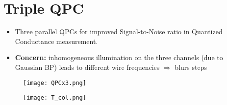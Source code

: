\documentclass[11pt]{article}
\begin{document}
\section{Triple QPC}
\begin{itemize}
	\item Three parallel QPCs for improved Signal-to-Noise ratio in Quantized Conductance measurement.
	\item \textbf{Concern:} inhomogeneous illumination on the three channels (due to Gaussian BP) leads to different wire frequencies $\Rightarrow$ blurs steps
\end{itemize}
\begin{figure}[b]
	\centering
		\texttt{[image: QPCx3.png]}
	\label{fig:QPCx3}
\end{figure}

\begin{figure}[b]
	\centering
		\texttt{[image: T\_col.png]}
	\label{fig:G_QPCx3}
\end{figure}

\vfill
\newpage


\end{document}
